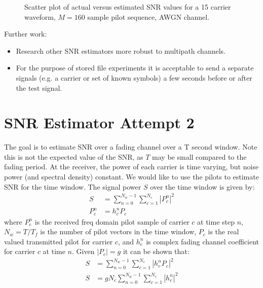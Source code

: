 \documentclass{article}
\begin{document}
\begin{figure}[H]
\caption{Scatter plot of actual versus estimated SNR values for a 15 carrier waveform, $M=160$ sample pilot sequence, AWGN channel.}
\label{fig:est_snr}
\begin{center}

\end{center}
\end{figure}

Further work:
\begin{itemize}
\item Research other SNR estimators more robust to multipath channels.
\item For the purpose of stored file experiments it is acceptable to send a separate signals (e.g. a carrier or set of known symbols) a few seconds before or after the test signal.
\end{itemize}

\section{SNR Estimator Attempt 2}

The goal is to estimate SNR over a fading channel over a T second window.  Note this is not the expected value of the SNR, as $T$ may be small compared to the fading period. At the receiver, the power of each carrier is time varying, but noise power (and spectral density) constant.  We would like to use the pilots to estimate SNR for the time window. The signal power $S$ over the time window is given by:
\begin{equation}
\begin{split}
S &= \sum_{n=0}^{N_w-1} \sum_{c=1}^{N_c} |P_c^n|^2 \\
P_c^n &= h_c^nP_c
\end{split}
\end{equation}
where $P_c^n$ is the received freq domain pilot sample of carrier $c$ at time step $n$, $N_w=T/T_f$ is the number of pilot vectors in the time window, $P_c$ is the real valued transmitted pilot for carrier $c$, and $h_c^n$ is complex fading channel coefficient for carrier $c$ at time $n$.  Given $|P_c|=g$ it can be shown that:
\begin{equation}
\begin{split}
S &= \sum_{n=0}^{N_w-1} \sum_{c=1}^{N_c}|h_c^nP_c|^2 \\
S &= gN_c\sum_{n=0}^{N_w-1} \sum_{c=1}^{N_c}|h_c^n|^2
\end{split}
\end{equation}
\end{document}
